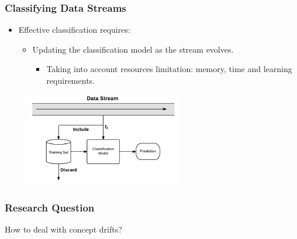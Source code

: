 \documentclass[14pt]{beamer}
\begin{document}
\begin{frame}\frametitle{Classifying Data Streams}

\begin{itemize}
\item Effective classification requires:
\begin{itemize}
\item Updating the classification model as the stream evolves.
\begin{itemize}
\item Taking into account resources limitation: memory, time and learning requirements.
\end{itemize}
\end{itemize}
\end{itemize}

\vspace{-0.2in}
\begin{figure}
\centering
\includegraphics[height=1.60in]{Stream2}
\end{figure}
\end{frame}


\begin{frame}\frametitle{Research Question}

\begin{center}
\large{How to deal with concept drifts?}
\end{center}
\end{frame}
\end{document}
